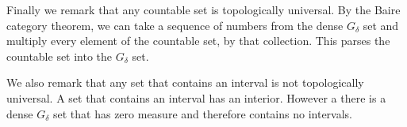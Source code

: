 Finally we remark that any countable set is topologically universal.  By the Baire category theorem, we can take a sequence of numbers from the dense $G_\delta$ set and multiply every element of the countable set, by that collection.  This parses the countable set into the $G_\delta$ set. 
    
We also remark that any set that contains an interval is not topologically universal.  A set that contains an interval has an interior.  However a there is a dense $G_\delta$ set that has zero measure and therefore contains no intervals. 